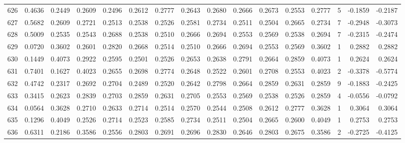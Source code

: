 \begin{tabular}{lrrrrrrrrrrrrrrr}
626 &      0.4636 &  0.2449 &  0.2609 &  0.2496 &  0.2612 &  0.2777 &  0.2643 &  0.2680 &  0.2666 &  0.2673 &   0.2553 &     0.2777 &      5 &                   -0.1859 &                    -0.2187 \\
627 &      0.5682 &  0.2609 &  0.2721 &  0.2513 &  0.2538 &  0.2526 &  0.2581 &  0.2734 &  0.2511 &  0.2504 &   0.2665 &     0.2734 &      7 &                   -0.2948 &                    -0.3073 \\
628 &      0.5009 &  0.2535 &  0.2543 &  0.2688 &  0.2538 &  0.2510 &  0.2666 &  0.2694 &  0.2553 &  0.2569 &   0.2538 &     0.2694 &      7 &                   -0.2315 &                    -0.2474 \\
629 &      0.0720 &  0.3602 &  0.2601 &  0.2820 &  0.2668 &  0.2514 &  0.2510 &  0.2666 &  0.2694 &  0.2553 &   0.2569 &     0.3602 &      1 &                    0.2882 &                     0.2882 \\
630 &      0.1449 &  0.4073 &  0.2922 &  0.2595 &  0.2501 &  0.2526 &  0.2653 &  0.2638 &  0.2791 &  0.2664 &   0.2859 &     0.4073 &      1 &                    0.2624 &                     0.2624 \\
631 &      0.7401 &  0.1627 &  0.4023 &  0.2655 &  0.2698 &  0.2774 &  0.2648 &  0.2522 &  0.2601 &  0.2708 &   0.2553 &     0.4023 &      2 &                   -0.3378 &                    -0.5774 \\
632 &      0.4742 &  0.2317 &  0.2692 &  0.2704 &  0.2489 &  0.2520 &  0.2642 &  0.2798 &  0.2664 &  0.2859 &   0.2631 &     0.2859 &      9 &                   -0.1883 &                    -0.2425 \\
633 &      0.3415 &  0.2623 &  0.2839 &  0.2703 &  0.2859 &  0.2631 &  0.2705 &  0.2553 &  0.2569 &  0.2538 &   0.2526 &     0.2859 &      4 &                   -0.0556 &                    -0.0792 \\
634 &      0.0564 &  0.3628 &  0.2710 &  0.2633 &  0.2714 &  0.2514 &  0.2570 &  0.2544 &  0.2508 &  0.2612 &   0.2777 &     0.3628 &      1 &                    0.3064 &                     0.3064 \\
635 &      0.1296 &  0.4049 &  0.2526 &  0.2714 &  0.2523 &  0.2585 &  0.2734 &  0.2511 &  0.2504 &  0.2665 &   0.2600 &     0.4049 &      1 &                    0.2753 &                     0.2753 \\
636 &      0.6311 &  0.2186 &  0.3586 &  0.2556 &  0.2803 &  0.2691 &  0.2696 &  0.2830 &  0.2646 &  0.2803 &   0.2675 &     0.3586 &      2 &                   -0.2725 &                    -0.4125 \\

\end{tabular}
